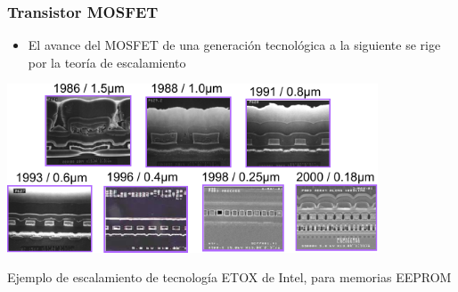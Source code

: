 \documentclass[t,aspectratio=169,10pt]{beamer}
\begin{document}
\begin{frame}
\frametitle{Transistor MOSFET}
\begin{itemize}
	\item El avance del MOSFET de una generación tecnológica a la siguiente se rige por la teoría de escalamiento
\end{itemize}

\centering
\includegraphics[width=11cm]{crosssections}

Ejemplo de escalamiento de tecnología ETOX de Intel, para memorias EEPROM
\end{frame}
\end{document}
